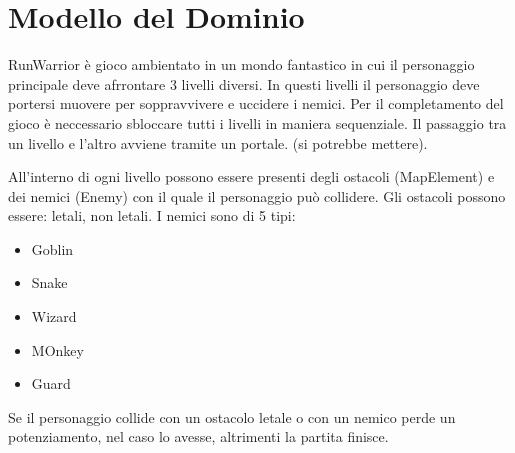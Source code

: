 \documentclass[a4paper,12pt]{report}
\begin{document}
\section{Modello del Dominio}
RunWarrior è gioco ambientato in un mondo fantastico in cui il personaggio principale deve afrrontare 3 livelli diversi. In questi
livelli il personaggio deve portersi muovere per soppravvivere e uccidere i nemici. Per il completamento del gioco è neccessario 
sbloccare tutti i livelli in maniera sequenziale. Il passaggio tra un livello e l'altro avviene tramite un portale. (si potrebbe
mettere).

All'interno di ogni livello possono essere presenti degli ostacoli (MapElement) e dei nemici (Enemy) con il quale il personaggio può collidere.
Gli ostacoli possono essere: letali, non letali. I nemici sono di 5 tipi:
\begin{itemize}
    \item Goblin
    \item Snake
    \item Wizard
    \item MOnkey 
    \item Guard
\end{itemize}
Se il personaggio collide con un ostacolo letale o con un nemico perde un potenziamento, nel caso lo avesse, altrimenti la partita
finisce. 
\end{document}

